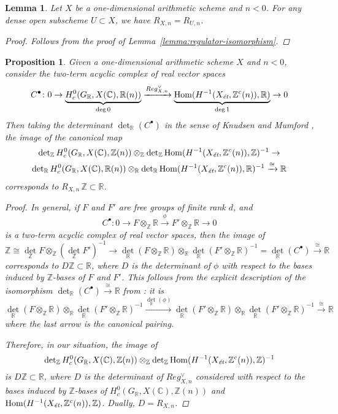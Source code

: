 \documentclass{article}
\DeclareMathOperator{\Hom}{Hom}
\newcommand{\CC}{\mathbb{C}}
\newcommand{\RR}{\mathbb{R}}
\newcommand{\ZZ}{\mathbb{Z}}
\renewcommand{\det}{\operatorname{det}}
\newcommand{\et}{\text{\it \'{e}t}}
\theoremstyle{myplain}
\newtheorem{proposition}[theorem]{Proposition}
\newtheorem{lemma}[theorem]{Lemma}
\theoremstyle{mydefinition}
\begin{document}
\begin{lemma}
  \label{lemma:regulator-dense-open-subset}
  Let $X$ be a one-dimensional arithmetic scheme and $n < 0$. For any dense open
  subscheme $U \subset X$, we have $R_{X,n} = R_{U,n}$.

  \begin{proof}
    Follows from the proof of Lemma~\ref{lemma:regulator-isomorphism}.
  \end{proof}
\end{lemma}

\begin{proposition}
  \label{prop:trivialization-of-free-part}
  Given a one-dimensional arithmetic scheme $X$ and $n < 0$, consider the
  two-term acyclic complex of real vector spaces
  \[ C^\bullet\colon
    0 \to
    \underbrace{H^0_c (G_\RR, X(\CC), \RR(n))}_{\deg 0}
    \xrightarrow{Reg_{X,n}^\vee}
    \underbrace{\Hom (H^{-1} (X_\et, \ZZ^c (n)), \RR)}_{\deg 1}
    \to 0 \]
  Then taking the determinant $\det_\RR (C^\bullet)$ in the sense of
  Knudsen and Mumford \cite{Knudsen-Mumford-1976},
  the image of the canonical map
  \begin{multline*}
    \det_\ZZ H^0_c (G_\RR, X(\CC), \ZZ(n)) \otimes_\ZZ
    \det_\ZZ \Hom (H^{-1} (X_\et, \ZZ^c (n)), \ZZ)^{-1} \to \\
    \det_\RR H^0_c (G_\RR, X(\CC), \RR (n)) \otimes_\RR
    \det_\RR \Hom (H^{-1} (X_\et, \ZZ^c (n)), \RR)^{-1}
    \xrightarrow{\cong} \RR
  \end{multline*}
  corresponds to $R_{X,n}\,\ZZ \subset \RR$.

  \begin{proof}
    In general, if $F$ and $F'$ are free groups of finite rank $d$, and
    $$C^\bullet\colon 0 \to F\otimes_\ZZ \RR \xrightarrow{\phi} F'\otimes_\ZZ \RR \to 0$$
    is a two-term acyclic complex of real vector spaces, then the image of
    \[ \ZZ \cong \det_\ZZ F \otimes_\ZZ (\det_\ZZ F')^{-1} \to
      \det_\RR (F\otimes_\ZZ \RR) \otimes_\RR \det_\RR (F' \otimes_\ZZ \RR)^{-1}
      = \det_\RR (C^\bullet) \xrightarrow{\cong} \RR \]
    corresponds to $D\ZZ \subset \RR$, where $D$ is the determinant of $\phi$ with
    respect to the bases induced by $\ZZ$-bases of $F$ and $F'$.
    This follows from the explicit description of the isomorphism
    $\det_\RR (C^\bullet) \xrightarrow{\cong} \RR$ from
    \cite[p.\,33]{Knudsen-Mumford-1976}: it is
    \[ \det_\RR (F \otimes_\ZZ \RR) \otimes_\RR
      \det_\RR (F'\otimes_\ZZ \RR)^{-1} \xrightarrow{\det_\RR (\phi)}
      \det_\RR (F' \otimes_\ZZ \RR) \otimes_\RR
      \det_\RR (F' \otimes_\ZZ \RR)^{-1} \xrightarrow{\cong} \RR \]
    where the last arrow is the canonical pairing.

    Therefore, in our situation, the image of
    \[ \det_\ZZ H^0_c (G_\RR, X(\CC), \ZZ(n)) \otimes_\ZZ
      \det_\ZZ \Hom (H^{-1} (X_\et, \ZZ^c (n)), \ZZ)^{-1} \]
    is $D \ZZ \subset \RR$, where $D$ is the determinant of $Reg_{X,n}^\vee$
    considered with respect to the bases induced by $\ZZ$-bases of
    $H^0_c (G_\RR, X(\CC), \ZZ(n))$ and
    $\Hom (H^{-1} (X_\et, \ZZ^c (n)), \ZZ)$. Dually, $D = R_{X,n}$.
  \end{proof}
\end{proposition}
\end{document}
